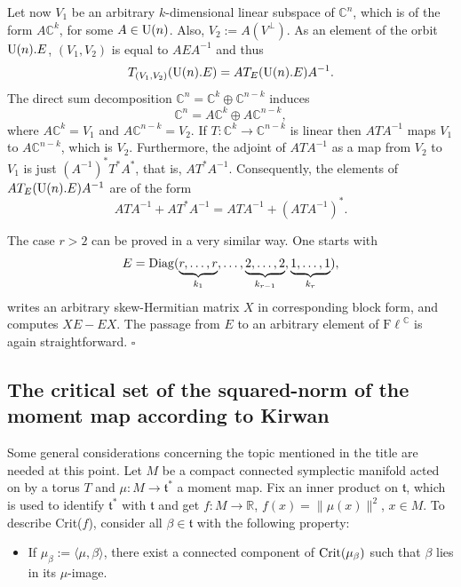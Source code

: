 \documentclass[12pt]{amsart}
\theoremstyle{definition}
\theoremstyle{remark}
\newtheorem{rem}[thm]{Remark}
\newcommand{\RR}{\mathbb R}
\newcommand{\CC}{\mathbb C}
\newcommand{\Fl}{{\mathrm{F\ell}}}
\begin{document}
Let now $V_1$ be an arbitrary $k$-dimensional linear subspace  of $\CC^n$, which is of the form $A\CC^k$, for some $A\in {\rm U}(n)$. Also, $V_2:=A(V^\perp)$. As an element of the orbit ${\rm U}(n).E$, $(V_1, V_2)$ is equal to $A E A^{-1}$ and thus 
$$T_{(V_1, V_2)} ({\rm U}(n).E)=AT_{E}({\rm U}(n).E)A^{-1}.$$
The direct sum decomposition $\CC^n= \CC^k \oplus \CC^{n-k}$ induces 
$$\CC^n= A \CC^k \oplus A \CC^{n-k},$$
where $A\CC^k = V_1$ and $A\CC^{n-k}= V_2$. 
If $T: \CC^k \to \CC^{n-k}$ is linear then $ATA^{-1}$ maps $V_1$ to $A\CC^{n-k}$, which is $V_2$. 
Furthermore, the adjoint of $ATA^{-1}$ as a map from $V_2$ to $V_1$ is just $(A^{-1})^*T^*A^*$, that is,
$AT^*A^{-1}$. Consequently, the elements of $AT_{E}({\rm U}(n).E)A^{-1}$ are of the form
$$ATA^{-1} + AT^*A^{-1}=ATA^{-1}+(ATA^{-1})^*.$$

The case $r>2$ can be proved in a very similar way. One starts with
$$
E={\rm Diag}(
\underbrace{r,\ldots,r}_{k_1},
\ldots,
\underbrace{2,\ldots,2}_{k_{r-1}},
\underbrace{1,\ldots,1}_{k_r}
),
$$
writes an arbitrary skew-Hermitian matrix $X$ in corresponding block form, and computes $XE-EX$. The passage from $E$ to an arbitrary element of $\Fl^\CC$ is again straightforward.
\hfill $\square$




\subsection{The critical set of the squared-norm of the moment map according to Kirwan} \label{critkir}

Some general considerations concerning the topic mentioned in the title are needed at this point. Let $M$ be a compact connected symplectic manifold acted on by a torus $T$ and $\mu: M \to {\mathfrak t}^*$ a moment map. 
Fix an inner product on ${\mathfrak t}$, which is used to identify ${\mathfrak t}^*$ with ${\mathfrak t}$ and get 
$f: M \to \RR$, $f(x)=\|\mu(x)\|^2$, $x\in M$. To describe Crit($f$), consider  all $\beta \in {\mathfrak t}$ with the following property:
\begin{itemize}
	\item[(P)] If $\mu_\beta:=\langle \mu, \beta\rangle$, there exist a connected component  of ${\rm Crit}(\mu_\beta)$ such that $\beta$ lies in its $\mu$-image. 
	\end{itemize} 
	
\end{document}
